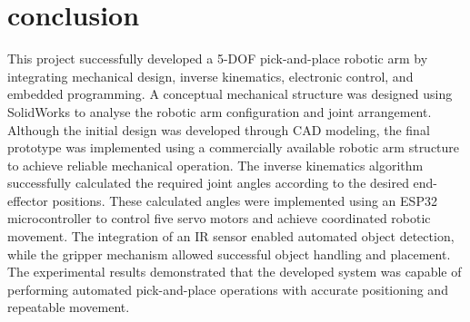 \section{conclusion}

This project successfully developed a 5-DOF pick-and-place robotic arm by integrating mechanical design, inverse kinematics, electronic control, and embedded programming. A conceptual mechanical structure was designed using SolidWorks to analyse the robotic arm configuration and joint arrangement. Although the initial design was developed through CAD modeling, the final prototype was implemented using a commercially available robotic arm structure to achieve reliable mechanical operation.
The inverse kinematics algorithm successfully calculated the required joint angles according to the desired end-effector positions. These calculated angles were implemented using an ESP32 microcontroller to control five servo motors and achieve coordinated robotic movement. The integration of an IR sensor enabled automated object detection, while the gripper mechanism allowed successful object handling and placement. The experimental results demonstrated that the developed system was capable of performing automated pick-and-place operations with accurate positioning and repeatable movement.
